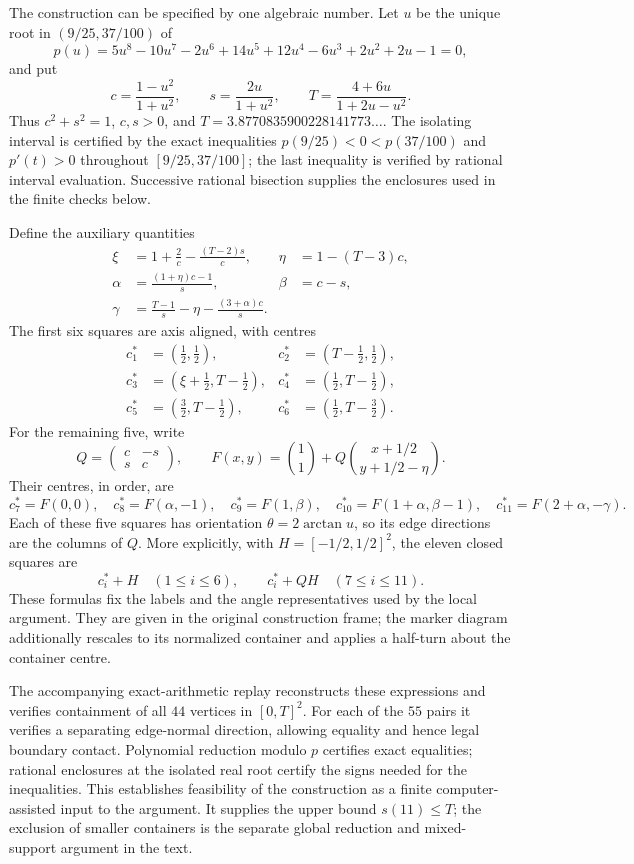 \documentclass[11pt]{article}
\begin{document}
The construction can be specified by one algebraic number.  Let $u$ be the
unique root in $(9/25,37/100)$ of
\[
 p(u)=5u^8-10u^7-2u^6+14u^5+12u^4-6u^3+2u^2+2u-1=0,
\]
and put
\[
 c=\frac{1-u^2}{1+u^2},\qquad
 s=\frac{2u}{1+u^2},\qquad
 T=\frac{4+6u}{1+2u-u^2}.
\]
Thus $c^2+s^2=1$, $c,s>0$, and
$T=3.8770835900228141773\ldots$.  The isolating interval is certified by
the exact inequalities $p(9/25)<0<p(37/100)$ and $p'(t)>0$ throughout
$[9/25,37/100]$; the last inequality is verified by rational interval
evaluation.  Successive rational bisection supplies the enclosures used in
the finite checks below.

Define the auxiliary quantities
\[
\begin{aligned}
 \xi&=1+\frac2c-\frac{(T-2)s}{c},
 &\eta&=1-(T-3)c,\\
 \alpha&=\frac{(1+\eta)c-1}{s},
 &\beta&=c-s,\\
 \gamma&=\frac{T-1}{s}-\eta-\frac{(3+\alpha)c}{s}.
\end{aligned}
\]
The first six squares are axis aligned, with centres
\[
\begin{aligned}
 c_1^*&=(\tfrac12,\tfrac12),
 &c_2^*&=(T-\tfrac12,\tfrac12),\\
 c_3^*&=(\xi+\tfrac12,T-\tfrac12),
 &c_4^*&=(\tfrac12,T-\tfrac12),\\
 c_5^*&=(\tfrac32,T-\tfrac12),
 &c_6^*&=(\tfrac12,T-\tfrac32).
\end{aligned}
\]
For the remaining five, write
\[
 Q=\begin{pmatrix}c&-s\\s&c\end{pmatrix},\qquad
 F(x,y)=\binom{1}{1}+Q\binom{x+1/2}{y+1/2-\eta}.
\]
Their centres, in order, are
\[
 c_7^*=F(0,0),\quad
 c_8^*=F(\alpha,-1),\quad
 c_9^*=F(1,\beta),\quad
 c_{10}^*=F(1+\alpha,\beta-1),\quad
 c_{11}^*=F(2+\alpha,-\gamma).
\]
Each of these five squares has orientation $\theta=2\arctan u$, so its
edge directions are the columns of $Q$.  More explicitly, with
$H=[-1/2,1/2]^2$, the eleven closed squares are
\[
 c_i^*+H\quad(1\le i\le6),\qquad
 c_i^*+QH\quad(7\le i\le11).
\]
These formulas fix the labels and the angle representatives used by the
local argument.  They are given in the original construction frame;
the marker diagram additionally rescales to its normalized container and
applies a half-turn about the container centre.

The accompanying exact-arithmetic replay reconstructs these expressions
and verifies containment of all $44$ vertices in $[0,T]^2$.  For each of
the $55$ pairs it verifies a separating edge-normal direction, allowing
equality and hence legal boundary contact.  Polynomial reduction modulo
$p$ certifies exact equalities; rational enclosures at the isolated real
root certify the signs needed for the inequalities.  This establishes
feasibility of the construction as a finite computer-assisted input to
the argument.  It supplies the upper bound $s(11)\le T$; the exclusion of
smaller containers is the separate global reduction and mixed-support argument in the text.
\end{document}
